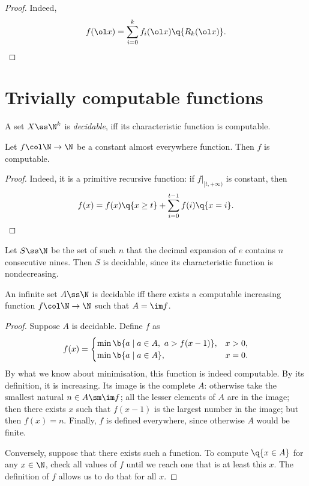 \begin{proof}
  Indeed,
  $$ f(\ol x) = \sum_{i=0}^k f_i(\ol x) \q{R_k(\ol x)}. $$
\end{proof}

\section{Trivially computable functions}

\begin{definition}
  A set $X \ss \N^k$ is \emph{decidable}, iff its characteristic function is computable.
\end{definition}

\begin{lemma}
  Let $f \col \N \to \N$ be a constant almost everywhere function. Then $f$ is computable.
\end{lemma}

\begin{proof}
  Indeed, it is a primitive recursive function: if $f|_{[t, +\infty)}$ is constant, then
  $$ f(x) = f(x) \q{x \ge t} + \sum_{i=0}^{t-1} f(i) \q{x=i}. $$
\end{proof}

\begin{example}
  Let $S \ss \N$ be the set of such $n$ that the decimal expansion of $e$ contains $n$ consecutive nines.
  Then $S$ is decidable, since its characteristic function is nondecreasing. 
\end{example}

\begin{lemma}
  An infinite set $A \ss \N$ is decidable iff there exists a computable increasing function $f \col \N \to \N$ such that $A = \im f$.
\end{lemma}

\begin{proof}
  Suppose $A$ is decidable. Define $f$ as 
  $$
  f(x)=
  \begin{cases}
    \min \b{a \mid a \in A,\ a > f(x-1)}, & x > 0, \\
    \min \b{a \mid a \in A}, & x = 0.
  \end{cases}
  $$
  By what we know about minimisation, this function is indeed computable.
  By its definition, it is increasing.
  Its image is the complete $A$: otherwise take the smallest natural $n \in A \sm \im f$; all the lesser elements of $A$ are in the image; then there exists $x$ such that $f(x-1)$ is the largest number in the image; but then $f(x) = n$. Finally, $f$ is defined everywhere, since otherwise $A$ would be finite.
  
  Conversely, suppose that there exists such a function.
  To compute $\q{x \in A}$ for any $x \in \N$, check all values of $f$ until we reach one that is at least this $x$. The definition of $f$ allows us to do that for all $x$.
\end{proof}

